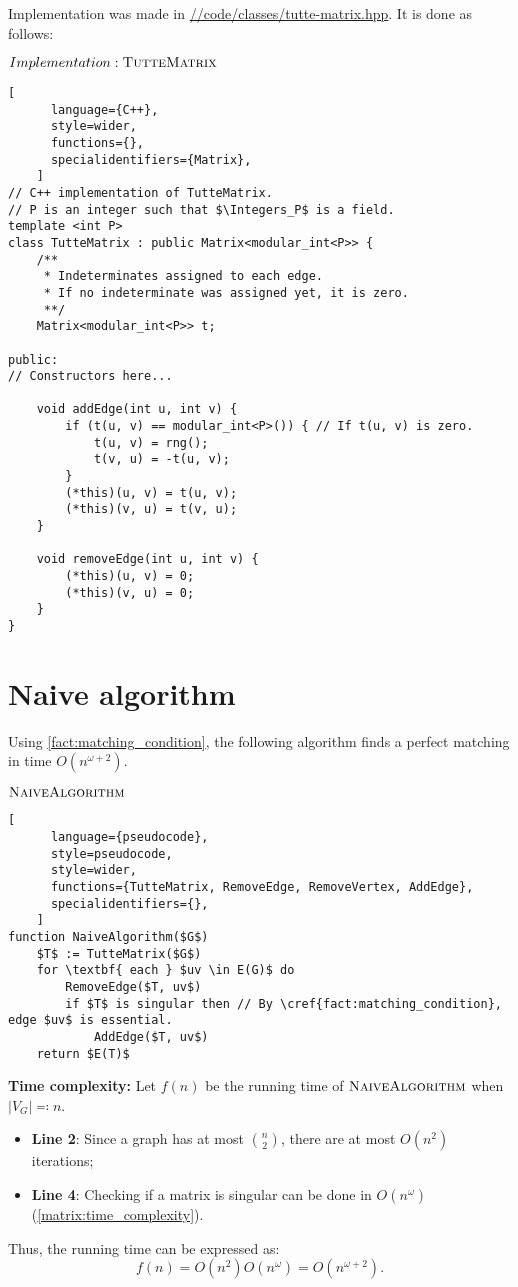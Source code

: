 Implementation was made in \href{https://github.com/antoniomsah/algebraic-max-matching/blob/main/code/classes/tutte-matrix.hpp}{//code/classes/tutte-matrix.hpp}.
It is done as follows:
\begin{programruledcaption}{\(Implementation: \textsc{TutteMatrix}\)}
    \begin{lstlisting}[
      language={C++},
      style=wider,
      functions={},
      specialidentifiers={Matrix},
    ]
// C++ implementation of TutteMatrix.
// P is an integer such that $\Integers_P$ is a field.
template <int P>
class TutteMatrix : public Matrix<modular_int<P>> {
    /** 
     * Indeterminates assigned to each edge.
     * If no indeterminate was assigned yet, it is zero.
     **/ 
    Matrix<modular_int<P>> t; 
    
public:
// Constructors here...

    void addEdge(int u, int v) {
        if (t(u, v) == modular_int<P>()) { // If t(u, v) is zero.
            t(u, v) = rng();
            t(v, u) = -t(u, v);
        }
        (*this)(u, v) = t(u, v);
        (*this)(v, u) = t(v, u);
    }

    void removeEdge(int u, int v) {
        (*this)(u, v) = 0;
        (*this)(v, u) = 0;
    }
}
    \end{lstlisting}
\end{programruledcaption}


\section{Naive algorithm}


Using \cref{fact:matching_condition}, the following algorithm finds a perfect matching in time \(O(n^{\omega+2})\).
\begin{programruledcaption}{\(\textsc{NaiveAlgorithm}\)}
    \begin{lstlisting}[
      language={pseudocode},
      style=pseudocode,
      style=wider,
      functions={TutteMatrix, RemoveEdge, RemoveVertex, AddEdge},
      specialidentifiers={},
    ]
function NaiveAlgorithm($G$)
    $T$ := TutteMatrix($G$)
    for \textbf{ each } $uv \in E(G)$ do
        RemoveEdge($T, uv$)
        if $T$ is singular then // By \cref{fact:matching_condition}, edge $uv$ is essential.
            AddEdge($T, uv$)
    return $E(T)$
    \end{lstlisting}
\end{programruledcaption}
\noindent
\textbf{Time complexity:}
Let \(f(n)\) be the running time of \(\textsc{NaiveAlgorithm}\) when \(|V_G| \eqcolon n\).
\begin{itemize}
    \item \textbf{Line 2}: Since a graph has at most \(\binom{n}{2}\), there are at most \(O(n^2)\) iterations;
    \item \textbf{Line 4}: Checking if a matrix is singular can be done in \(O(n^\omega)\) (\cref{matrix:time_complexity}).
\end{itemize}
Thus, the running time can be expressed as:
\[
    f(n) = O(n^2) O(n^\omega) = O(n^{\omega+2}).
\]

